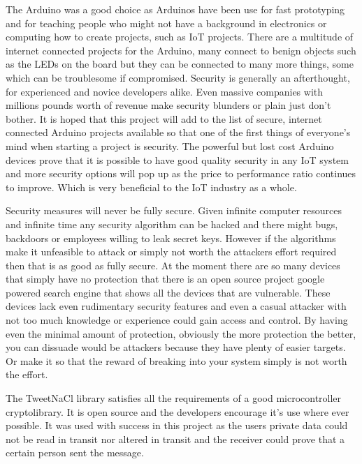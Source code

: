 The Arduino was a good choice as Arduinos have been use for fast prototyping and for teaching people who might not have a background in electronics or computing how to create projects, such as IoT projects. There are a multitude of internet connected projects for the Arduino, many connect to benign objects such as the LEDs on the board but they can be connected to many more things, some which can be troublesome if compromised. Security is generally an afterthought, for experienced and novice developers alike. Even massive companies with millions pounds worth of revenue make security blunders or plain just don't bother. It is hoped that this project will add to the list of secure, internet connected Arduino projects available so that one of the first things of everyone's mind when starting a project is security. The powerful but lost cost Arduino devices prove that it is possible to have good quality security in any IoT system and more security options will pop up as the price to performance ratio continues to improve. Which is very beneficial to the IoT industry as a whole.

Security measures will never be fully secure. Given infinite computer resources and infinite time any security algorithm can be hacked and there might bugs, backdoors or employees willing to leak secret keys. However if the algorithms make it unfeasible to attack or simply not worth the attackers effort required then that is as good as fully secure. At the moment there are so many devices that simply have no protection that there is an open source project google powered search engine that shows all the devices that are vulnerable\cite{censys}. These devices lack even rudimentary security features and even a casual attacker with not too much knowledge or experience could gain access and control. By having even the minimal amount of protection, obviously the more protection the better, you can dissuade would be attackers because they have plenty of easier targets. Or make it so that the reward of breaking into your system simply is not worth the effort.

The TweetNaCl library satisfies all the requirements of a good microcontroller cryptolibrary. It is open source and the developers encourage it's use where ever possible. It was used with success in this project as the users private data could not be read in transit nor altered in transit and the receiver could prove that a certain person sent the message. 
